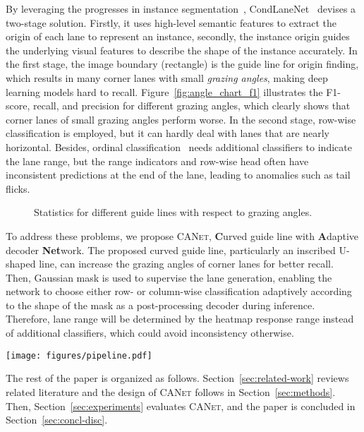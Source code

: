 \documentclass{article}
\newcommand\self{\textsc{CANet}\xspace}
\begin{document}
By leveraging the progresses in instance segmentation~\cite{yolact, blendmask, condinst}, CondLaneNet~\cite{condlanenet} devises a two-stage solution. Firstly, it uses high-level semantic features to extract the origin of each lane to represent an instance, secondly, the instance origin guides the underlying visual features to describe the shape of the instance accurately. In the first stage, the image boundary (rectangle) is the guide line for origin finding, which results in many corner lanes with small \emph{grazing angles}, making deep learning models hard to recall. Figure~\ref{fig:angle_chart_f1} illustrates the F1-score, recall, and precision for different grazing angles, which clearly shows that corner lanes of small grazing angles perform worse. In the second stage, row-wise classification is employed, but it can hardly deal with lanes that are nearly horizontal.
Besides, ordinal classification~\cite{ultra_fast} needs additional classifiers to indicate the lane range, but the range indicators and row-wise head often have inconsistent predictions at
the end of the lane, leading to anomalies such as tail flicks.
\begin{figure}
  \centering
  \hfill {}
  \caption{Statistics for different guide lines with respect to grazing angles.}
  \label{fig:angle_chart}
\end{figure}

To address these problems, we propose \self, \textbf{C}urved guide line with
\textbf{A}daptive decoder \textbf{Net}work. The proposed curved guide line,
particularly an inscribed U-shaped line, can increase the grazing angles of
corner lanes for better recall. Then, Gaussian mask is used to supervise the
lane generation, enabling the network to choose either row- or column-wise
classification adaptively according to the shape of the mask as a
post-processing decoder during inference. Therefore, lane range will be
determined by the heatmap response range instead of additional classifiers,
which could avoid inconsistency otherwise.
\begin{figure*}
  \centering
  \texttt{[image: figures/pipeline.pdf]}
  \caption{The structure of \self.}\label{fig:arch}
\end{figure*}

The rest of the paper is organized as follows. Section~\ref{sec:related-work}
reviews related literature and the design of \self follows in
Section~\ref{sec:methods}. Then, Section~\ref{sec:experiments} evaluates \self,
and the paper is concluded in Section~\ref{sec:concl-disc}.
\end{document}
